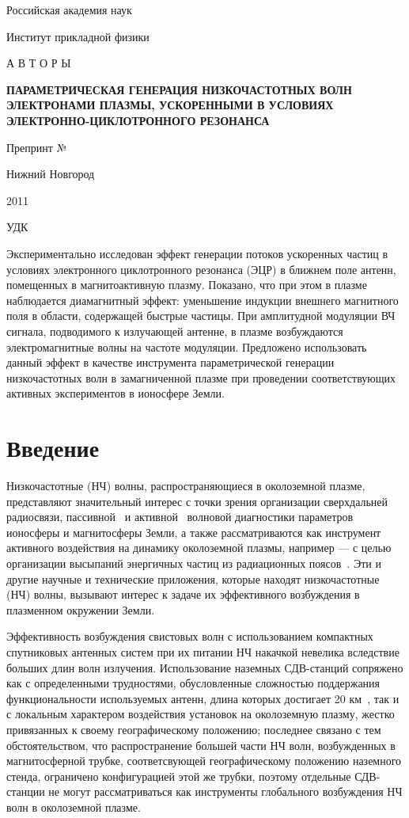 \documentclass[10pt]{disser}
\begin{document}
\Russian
\thispagestyle{empty}
\vspace{1.5cm}
\centerline{Российская академия наук}
\centerline{Институт прикладной физики}
\vspace{3cm}
\centerline{А В Т О Р Ы}
\vspace{0.8cm}
\begin{center}
\large 
\textbf{ПАРАМЕТРИЧЕСКАЯ ГЕНЕРАЦИЯ НИЗКОЧАСТОТНЫХ ВОЛН ЭЛЕКТРОНАМИ ПЛАЗМЫ, УСКОРЕННЫМИ В УСЛОВИЯХ ЭЛЕКТРОННО-ЦИКЛОТРОННОГО РЕЗОНАНСА}
\end{center}
\vspace{2cm}
\centerline{\large Препринт № }
\vfill
\centerline{Нижний Новгород}
\centerline{2011}
\newpage
\thispagestyle{empty}
\begin{flushleft}
УДК
\end{flushleft}

Экспериментально исследован эффект генерации потоков ускоренных частиц в условиях электронного циклотронного резонанса (ЭЦР) в ближнем поле антенн, помещенных в магнитоактивную плазму. Показано, что при этом в плазме наблюдается диамагнитный эффект: уменьшение индукции внешнего магнитного поля в области, содержащей быстрые частицы. При амплитудной модуляции ВЧ сигнала, подводимого к излучающей антенне, в плазме возбуждаются электромагнитные волны на частоте модуляции. Предложено использовать данный эффект в качестве  инструмента параметрической генерации  низкочастотных волн в замагниченной плазме при проведении соответствующих активных экспериментов в ионосфере Земли. 

\newpage
\section{Введение}
Низкочастотные (НЧ) волны, распространяющиеся в околоземной плазме, представляют значительный интерес с точки зрения организации сверхдальней радиосвязи, пассивной~\cite{AWD} и активной~\cite{IMAGE,RPI} волновой диагностики параметров ионосферы и магнитосферы Земли, а также рассматриваются как инструмент активного воздействия на динамику околоземной плазмы, например --- с целью организации высыпаний энергичных частиц из радиационных поясов~\cite{Demekhov, InanBellBortnik, Rory}. Эти и другие научные и технические приложения, которые находят низкочастотные (НЧ) волны, вызывают интерес к задаче их эффективного возбуждения в плазменном окружении Земли. 

Эффективность возбуждения свистовых волн с использованием компактных спутниковых антенных систем при их питании НЧ накачкой невелика вследствие больших длин волн излучения. Использование наземных СДВ-станций сопряжено как с определенными трудностями, обусловленные сложностью  поддержания функциональности используемых антенн, длина которых достигает 20 км~\cite{SPBEACON}, так и с локальным характером воздействия установок  на околоземную плазму, жестко привязанных к своему географическому положению; последнее связано с тем обстоятельством, что распространение большей части НЧ волн, возбужденных в магнитосферной трубке, соответсвующей географическому положению наземного стенда, ограничено конфигурацией этой же трубки, поэтому отдельные СДВ-станции  не могут рассматриваться как инструменты глобального возбуждения НЧ волн в околоземной плазме.
    
\end{document}
